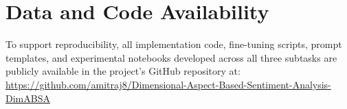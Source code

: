 \documentclass{article}
\begin{document}
\section*{Data and Code Availability}

To support reproducibility, all implementation code, fine-tuning scripts, prompt templates, and experimental notebooks developed across all three subtasks are publicly available in the project's GitHub repository at: \url{https://github.com/amitraj8/Dimensional-Aspect-Based-Sentiment-Analysis-DimABSA}

 

\end{document}
